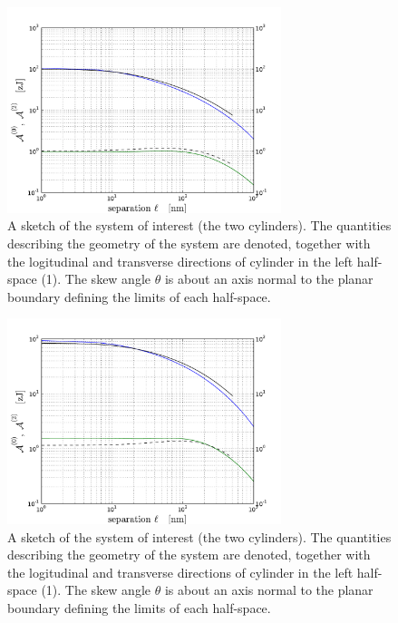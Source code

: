 \documentclass[onecolumn,letterpaper,amsmath,amssymb,floatfix,aps,superscriptaddress]{revtex4}
\begin{document}
\begin{figure}
\centerline{\includegraphics[width=8cm]{140309_65w65_GH_skew_ret_A0_A2.pdf}}
\caption{A sketch of the system of interest (the two cylinders). The quantities describing the geometry of the system are 
denoted, together with the logitudinal and transverse directions of cylinder in the left half-space (1). The skew angle $\theta$ is about an axis normal to the planar boundary defining the limits of each half-space.
}
\label{fig:sketch}
\end{figure}

\begin{figure}
\centerline{\includegraphics[width=8cm]{140309_91w91_GH_skew_ret_A0_A2.pdf}}
\caption{A sketch of the system of interest (the two cylinders). The quantities describing the geometry of the system are 
denoted, together with the logitudinal and transverse directions of cylinder in the left half-space (1). The skew angle $\theta$ is about an axis normal to the planar boundary defining the limits of each half-space.
}
\label{fig:sketch}
\end{figure}
\end{document}
